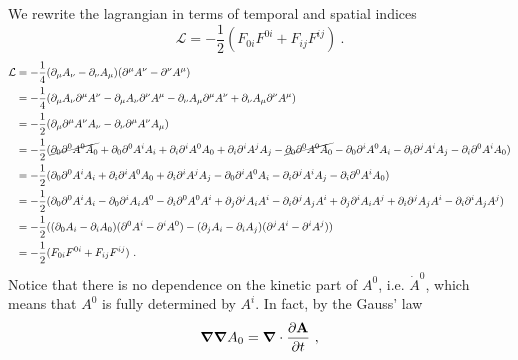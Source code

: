     We rewrite the lagrangian in terms of temporal and spatial indices
    \begin{equation*}
        \mathcal L = - \frac{1}{2} (F_{0i} F^{0i} + F_{ij} F^{ij} ) ~.
    \end{equation*} 
    \begin{equation*}
    \begin{aligned}
        \mathcal L & = - \frac{1}{4} (\partial_\mu A_\nu - \partial_\nu A_\mu)(\partial^\mu A^\nu - \partial^\nu A^\mu) \\ & = -\frac{1}{4} (\partial_\mu A_\nu \partial^\mu A^\nu - \partial_\mu A_\nu \partial^\nu A^\mu -  \partial_\nu A_\mu \partial^\mu A^\nu + \partial_\nu A_\mu \partial^\nu A^\mu) \\ & = - \frac{1}{2} (\partial_\mu \partial^\mu A^\nu A_\nu - \partial_\nu \partial^\mu A^\nu A_\mu) \\ & = - \frac{1}{2} (\cancel{\partial_0 \partial^0 A^0 A_0} + \partial_0 \partial^0 A^i A_i + \partial_i \partial^i A^0 A_0 + \partial_i \partial^i A^j A_j - \cancel{\partial_0 \partial^0 A^0 A_0} - \partial_0 \partial^i A^0 A_i - \partial_i \partial^j A^i A_j - \partial_i \partial^0 A^i A_0) \\ & = - \frac{1}{2} (\partial_0 \partial^0 A^i A_i + \partial_i \partial^i A^0 A_0 + \partial_i \partial^i A^j A_j - \partial_0 \partial^i A^0 A_i - \partial_i \partial^j A^i A_j - \partial_i \partial^0 A^i A_0) \\ & = - \frac{1}{2} 
        (\partial_0 \partial^0 A^i A_i - \partial_0 \partial^i A_i A^0 - \partial_i  \partial^0 A^0 A^i + \partial_j \partial^j A_i A^i - \partial_i \partial^j A_j A^i + \partial_j \partial^i A_i A^j + \partial_i \partial^j A_j A^i - \partial_i \partial^i A_j A^j ) \\ & = - \frac{1}{2} ((\partial_0 A_i - \partial_i A_0) (\partial^0 A^i - \partial^i A^0) - (\partial_j A_i - \partial_i A_j) (\partial^j A^i - \partial^i A^j)) \\ & = - \frac{1}{2} (F_{0i} F^{0i} + F_{ij} F^{ij} ) ~.
    \end{aligned}
    \end{equation*}
    Notice that there is no dependence on the kinetic part of $A^0$, i.e. $\dot A^0$, which means that $A^0$ is fully determined by $A^i$. In fact, by the Gauss' law 
    \begin{equation*}
        \boldsymbol \nabla \boldsymbol \nabla A_0 = \boldsymbol \nabla \cdot \frac{\partial\mathbf A}{\partial t} ~,
    \end{equation*}

